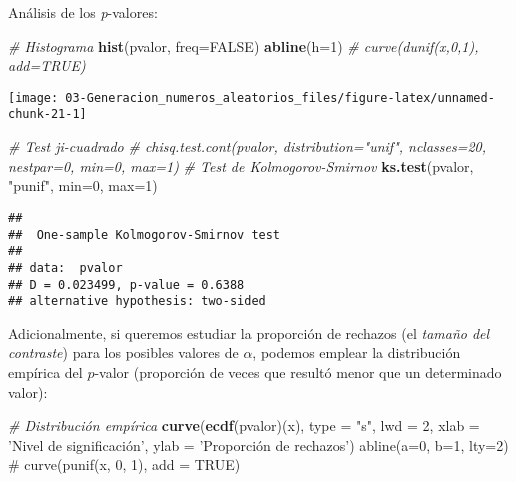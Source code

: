 \documentclass[
]{book}
\newenvironment{Shaded}{\begin{snugshade}}{\end{snugshade}}
\newcommand{\CommentTok}[1]{\textcolor[rgb]{0.56,0.35,0.01}{\textit{#1}}}
\newcommand{\DataTypeTok}[1]{\textcolor[rgb]{0.13,0.29,0.53}{#1}}
\newcommand{\DecValTok}[1]{\textcolor[rgb]{0.00,0.00,0.81}{#1}}
\newcommand{\KeywordTok}[1]{\textcolor[rgb]{0.13,0.29,0.53}{\textbf{#1}}}
\newcommand{\NormalTok}[1]{#1}
\newcommand{\OtherTok}[1]{\textcolor[rgb]{0.56,0.35,0.01}{#1}}
\newcommand{\StringTok}[1]{\textcolor[rgb]{0.31,0.60,0.02}{#1}}
\theoremstyle{break}
\theoremstyle{definition}
\theoremstyle{definition}
\theoremstyle{definition}
\theoremstyle{remark}
\begin{document}
Análisis de los \emph{p}-valores:

\begin{Shaded}
\begin{Highlighting}[]
\CommentTok{# Histograma}
\KeywordTok{hist}\NormalTok{(pvalor, }\DataTypeTok{freq=}\OtherTok{FALSE}\NormalTok{)}
\KeywordTok{abline}\NormalTok{(}\DataTypeTok{h=}\DecValTok{1}\NormalTok{) }\CommentTok{# curve(dunif(x,0,1), add=TRUE)}
\end{Highlighting}
\end{Shaded}

\begin{center}\texttt{[image: 03-Generacion\_numeros\_aleatorios\_files/figure-latex/unnamed-chunk-21-1]} \end{center}

\begin{Shaded}
\begin{Highlighting}[]
\CommentTok{# Test ji-cuadrado}
\CommentTok{# chisq.test.cont(pvalor, distribution="unif", nclasses=20, nestpar=0, min=0, max=1)}
\CommentTok{# Test de Kolmogorov-Smirnov}
\KeywordTok{ks.test}\NormalTok{(pvalor, }\StringTok{"punif"}\NormalTok{,  }\DataTypeTok{min=}\DecValTok{0}\NormalTok{, }\DataTypeTok{max=}\DecValTok{1}\NormalTok{)}
\end{Highlighting}
\end{Shaded}

\begin{verbatim}
## 
##  One-sample Kolmogorov-Smirnov test
## 
## data:  pvalor
## D = 0.023499, p-value = 0.6388
## alternative hypothesis: two-sided
\end{verbatim}

Adicionalmente, si queremos estudiar la proporción de rechazos (el \emph{tamaño del contraste}) para los posibles valores de \(\alpha\), podemos emplear la distribución empírica del \(p\)-valor (proporción de veces que resultó menor que un determinado valor):

\begin{Shaded}
\begin{Highlighting}[]
\CommentTok{# Distribución empírica}
\KeywordTok{curve}\NormalTok{(}\KeywordTok{ecdf}\NormalTok{(pvalor)(x), }\DataTypeTok{type =} \StringTok{"s"}\NormalTok{, }\DataTypeTok{lwd =} \DecValTok{2}\NormalTok{, }
      \DataTypeTok{xlab =} \StringTok{'Nivel de significación', ylab = '}\NormalTok{Proporción de rechazos}\StringTok{')}
\StringTok{abline(a=0, b=1, lty=2)   # curve(punif(x, 0, 1), add = TRUE)}
\end{Highlighting}
\end{Shaded}
\end{document}
